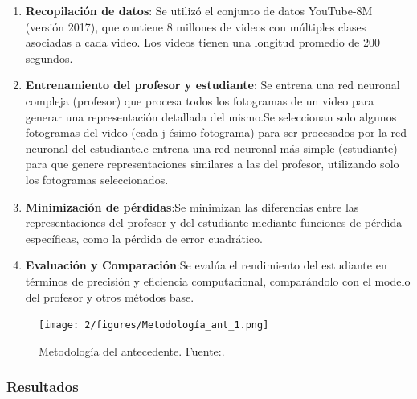 \begin{enumerate}
	\item \textbf{Recopilación de datos}: Se utilizó el conjunto de datos YouTube-8M (versión 2017), que contiene 8 millones de videos con múltiples clases asociadas a cada video. Los videos tienen una longitud promedio de 200 segundos.
	\item \textbf{Entrenamiento del profesor y estudiante}:  Se entrena una red neuronal compleja (profesor) que procesa todos los fotogramas de un video para generar una representación detallada del mismo.Se seleccionan solo algunos fotogramas del video (cada j-ésimo fotograma) para ser procesados por la red neuronal del estudiante.e entrena una red neuronal más simple (estudiante) para que genere representaciones similares a las del profesor, utilizando solo los fotogramas seleccionados.
	\item \textbf{Minimización de pérdidas}:Se minimizan las diferencias entre las representaciones del profesor y del estudiante mediante funciones de pérdida específicas, como la pérdida de error cuadrático.
	\item \textbf{Evaluación y Comparación}:Se evalúa el rendimiento del estudiante en términos de precisión y eficiencia computacional, comparándolo con el modelo del profesor y otros métodos base.
\end{enumerate}

\begin{figure}[H]
	\centering
	\texttt{[image: 2/figures/Metodología\_ant\_1.png]}
	\caption{Metodología del antecedente. Fuente:\cite {bhardwaj2019efficient}.}

	\label{1:fig}
\end{figure}


\subsubsection{Resultados}

